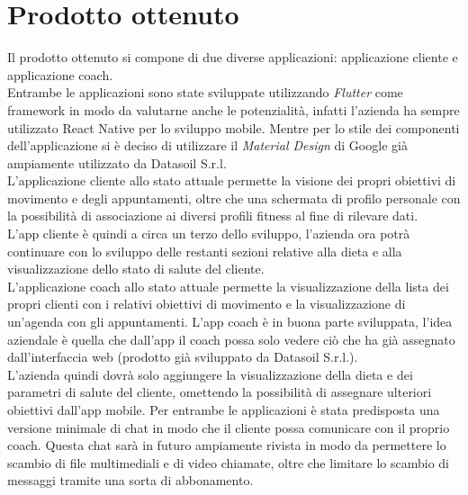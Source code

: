 \section{Prodotto ottenuto}
Il prodotto ottenuto si compone di due diverse applicazioni: applicazione cliente e applicazione coach.\\
Entrambe le applicazioni sono state sviluppate utilizzando \textit{Flutter} come framework in modo da valutarne anche le potenzialità, infatti l'azienda ha sempre utilizzato React Native per lo sviluppo mobile. Mentre per lo stile dei componenti dell'applicazione si è deciso di utilizzare il \textit{Material Design} di Google già ampiamente utilizzato da Datasoil S.r.l.\\
L'applicazione cliente allo stato attuale permette la visione dei propri obiettivi di movimento e degli appuntamenti, oltre che una schermata di profilo personale con la possibilità di associazione ai diversi profili fitness al fine di rilevare dati.\\
L'app cliente è quindi a circa un terzo dello sviluppo, l'azienda ora potrà continuare con lo sviluppo delle restanti sezioni relative alla dieta e alla visualizzazione dello stato di salute del cliente. \\
L'applicazione coach allo stato attuale permette la visualizzazione della lista dei propri clienti con i relativi obiettivi di movimento e la visualizzazione di un'agenda con gli appuntamenti. L'app coach è in buona parte sviluppata, l'idea aziendale è quella che dall'app il coach possa solo vedere ciò che ha già assegnato dall'interfaccia web (prodotto già sviluppato da Datasoil S.r.l.). \\
L'azienda quindi dovrà solo aggiungere la visualizzazione della dieta e dei parametri di salute del cliente, omettendo la possibilità di assegnare ulteriori obiettivi dall'app mobile. 
Per entrambe le applicazioni è stata predisposta una versione minimale di chat in modo che il cliente possa comunicare con il proprio coach. Questa chat sarà in futuro ampiamente rivista in modo da permettere lo scambio di file multimediali e di video chiamate, oltre che limitare lo scambio di messaggi tramite una sorta di abbonamento.
